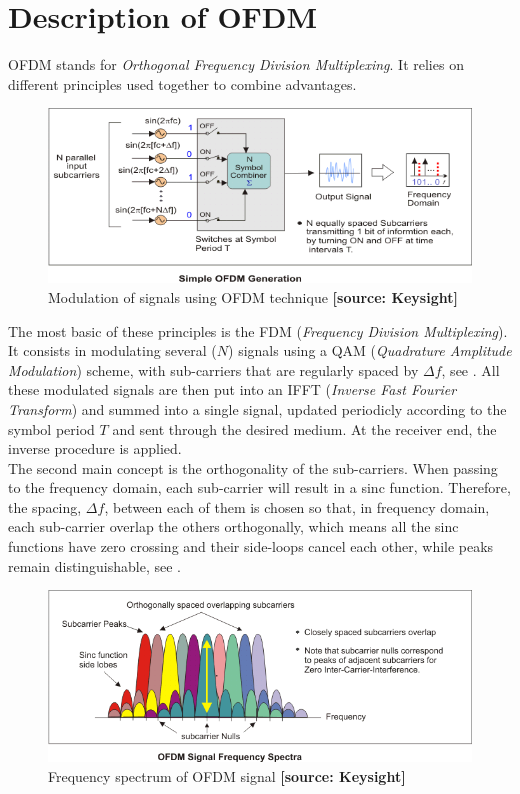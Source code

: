 \section{Description of OFDM} 
\indent OFDM stands for \textit{Orthogonal Frequency Division Multiplexing}. It relies on different principles used together to combine advantages.\\
%
\begin{figure}[H]
  \centering
  \includegraphics[width=\textwidth]{figures/ofdm-simplegenerator.png}
  \caption{Modulation of signals using OFDM technique \textbf{[source: Keysight]}}
  \label{fig:OFDMGenerator}
\end{figure}
\indent The most basic of these principles is the FDM (\textit{Frequency Division Multiplexing}). It consists in modulating several ($N$) signals using a QAM (\textit{Quadrature Amplitude Modulation}) scheme, with sub-carriers that are regularly spaced by $\Delta f$, see .
All these modulated signals are then put into an IFFT (\textit{Inverse Fast Fourier Transform}) and summed into a single signal, updated periodicly according to the symbol period $T$ and sent through the desired medium. At the receiver end, the inverse procedure is applied.\\
%
\indent The second main concept is the orthogonality of the sub-carriers. When passing to the frequency domain, each sub-carrier will result in a sinc function. Therefore, the spacing, $\Delta f$, between each of them is chosen so that, in frequency domain, each sub-carrier overlap the others orthogonally, which means all the sinc functions have zero crossing and their side-loops cancel each other, while peaks remain distinguishable, see .
%
\begin{figure}[H]
  \centering
  \includegraphics[width=\textwidth]{figures/ofdm-orthogonalspacedsubcarriers.png}
  \caption{Frequency spectrum of OFDM signal \textbf{[source: Keysight]}}
  \label{fig:freqOrthoSinc}
\end{figure}

